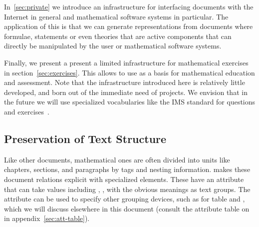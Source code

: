 In~\ref{sec:private} we introduce an infrastructure for interfacing {\omdoc}
documents with the Internet in general and mathematical software systems in
particular. The application of this is that we can generate representations from
{\omdoc} documents where formulae, statements or even theories that are active
components that can directly be manipulated by the user or mathematical software
systems.

Finally, we present a present a limited infrastructure for mathematical exercises
in section~\ref{sec:exercises}. This allows to use {\omdoc} as a basis for
mathematical education and assessment. Note that the infrastructure introduced
here is relatively little developed, and born out of the immediate need of
{\omdoc} projects. We envision that in the future we will use specialized {\xml}
vocabularies like the IMS standard for questions and
exercises~\cite{SmyShe:iqti01}.

\subsection{Preservation of Text Structure}\label{sec:text-structure}

Like other documents, mathematical ones are often divided into units like
chapters, sections, and paragraphs by tags and nesting information. {\omdoc} makes
these document relations explicit with specialized {} elements.
These have an attribute {} that can take values including
{}, {},
{} with the obvious meanings as text groups. The
{} attribute can be used to specify other grouping
devices, such as {} for table and
{}, which we will discuss elsewhere in
this document (consult the attribute table on in appendix~\ref{sec:att-table}).

